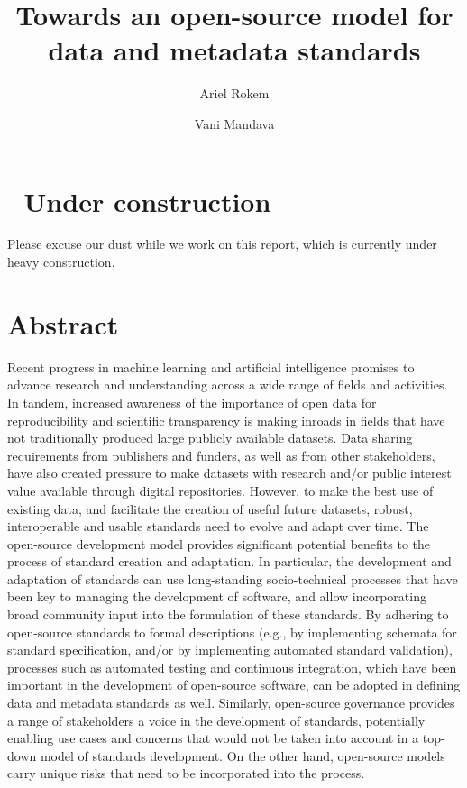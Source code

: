 \documentclass[
  letterpaper,
  DIV=11,
  numbers=noendperiod]{scrartcl}
\title{Towards an open-source model for data and metadata standards}
\author{Ariel Rokem \and Vani Mandava}
\date{}
\begin{document}
\maketitle

\section{🚧 Under construction 🚧}\label{under-construction}

Please excuse our dust while we work on this report, which is currently
under heavy construction.

\section{Abstract}\label{abstract}

Recent progress in machine learning and artificial intelligence promises
to advance research and understanding across a wide range of fields and
activities. In tandem, increased awareness of the importance of open
data for reproducibility and scientific transparency is making inroads
in fields that have not traditionally produced large publicly available
datasets. Data sharing requirements from publishers and funders, as well
as from other stakeholders, have also created pressure to make datasets
with research and/or public interest value available through digital
repositories. However, to make the best use of existing data, and
facilitate the creation of useful future datasets, robust, interoperable
and usable standards need to evolve and adapt over time. The open-source
development model provides significant potential benefits to the process
of standard creation and adaptation. In particular, the development and
adaptation of standards can use long-standing socio-technical processes
that have been key to managing the development of software, and allow
incorporating broad community input into the formulation of these
standards. By adhering to open-source standards to formal descriptions
(e.g., by implementing schemata for standard specification, and/or by
implementing automated standard validation), processes such as automated
testing and continuous integration, which have been important in the
development of open-source software, can be adopted in defining data and
metadata standards as well. Similarly, open-source governance provides a
range of stakeholders a voice in the development of standards,
potentially enabling use cases and concerns that would not be taken into
account in a top-down model of standards development. On the other hand,
open-source models carry unique risks that need to be incorporated into
the process.
\end{document}

